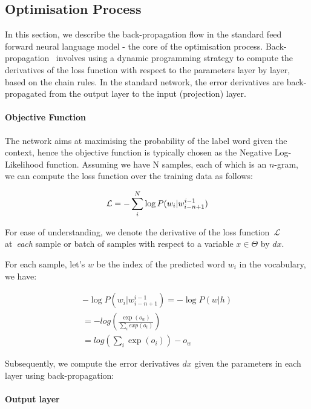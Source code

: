 \subsection{Optimisation Process}
In this section, we describe the back-propagation flow in the standard feed forward neural language model - the core of the optimisation process. Back-propagation~\cite{rumelhart1985learning} involves using a dynamic programming strategy to compute the derivatives of the loss function with respect to the parameters layer by layer, based on the chain rules. In the standard network, the error derivatives are back-propagated from the output layer to the input (projection) layer.

\paragraph{Objective Function}

The network aims at maximising the probability of the label word given the context, hence the objective function is typically chosen as the Negative Log-Likelihood function. Assuming we have N samples, each of which is an $n$-gram, we can compute the loss function over the training data as follows:

\begin{equation}
\mathcal{L} = - 	\sum_{i}^N \log P( w_i | w_{i-n+1}^{i-1} ) \\
\label{eq:objective}
\end{equation}

For ease of understanding, we denote the derivative of the loss function~$\mathcal{L}$ at~\textit{each} sample or batch of samples with respect to a variable $x \in \Theta$ by $dx$.  

For each sample, let's $w$ be the index of the predicted word $w_i$ in the vocabulary, we have:

\begin{equation}
\begin{aligned}
- \log P(w_i |  w_{i-n+1}^{i-1})  = - \log P(w | h) \\
= - log (\frac{\exp (o_w)}{\sum_i exp(o_i)}) \\
=  log(\sum_i \exp(o_i)) - o_w
\label{eq:objective2}
\end{aligned}
\end{equation}

Subsequently, we compute the error derivatives $dx$ given the parameters in each layer using back-propagation:

\paragraph{Output layer}

